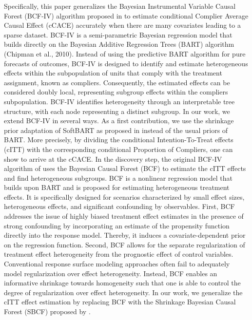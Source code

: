 Specifically, this paper generalizes the Bayesian Instrumental Variable Causal Forest (BCF-IV) algorithm proposed in \cite{bargagli-stoffi_heterogeneous_2022} to estimate conditional Complier Average Causal Effect (cCACE) accurately when there are many covariates leading to a sparse dataset. 
BCF-IV is a semi-parametric Bayesian regression model that builds directly on the Bayesian Additive Regression Trees (BART) algorithm (Chipman et al., 2010).
Instead of using the predictive BART algorithm for pure forecasts of outcomes, BCF-IV is designed to identify and estimate heterogeneous effects within the subpopulation of units that comply with the treatment assignment, known as compliers. 
Consequently, the estimated effects can be considered doubly local, representing subgroup effects within the compliers subpopulation.
BCF-IV identifies heterogeneity through an interpretable tree structure, with each node representing a distinct subgroup. In our work, we extend BCF-IV in several ways. As a first contribution, we use the shrinkage prior adaptation of SoftBART as proposed in \citep{linero_bayesian_2018,linero_bayesian_2018-1} instead of the usual priors of BART.
More precisely, by dividing the conditional Intention-To-Treat effects (cITT) with the corresponding conditional Proportion of Compliers, one can show to arrive at the cCACE.
In the discovery step, the original BCF-IV algorithm of \citep{bargagli-stoffi_heterogeneous_2022} uses the Bayesian Causal Forest (BCF) \citep{hahn_bayesian_2020} to estimate the cITT effects and find heterogeneous subgroups.  
BCF is a nonlinear regression model that builds upon BART and is proposed for estimating heterogeneous treatment effects. It is specifically designed for scenarios characterized by small effect sizes, heterogeneous effects, and significant confounding by observables.
First, BCF addresses the issue of highly biased treatment effect estimates in the presence of strong confounding by incorporating an estimate of the propensity function directly into the response model. 
Thereby, it induces a covariate-dependent prior on the regression function. 
Second, BCF allows for the separate regularization of treatment effect heterogeneity from the prognostic effect of control variables. 
Conventional response surface modeling approaches often fail to adequately model regularization over effect heterogeneity.
Instead, BCF enables an informative shrinkage towards homogeneity such that one is able to control the degree of regularization over effect heterogeneity.
In our work, we generalize the cITT effect estimation by replacing BCF with the Shrinkage Bayesian Causal Forest (SBCF) proposed by \citep{caron_shrinkage_2022}.
